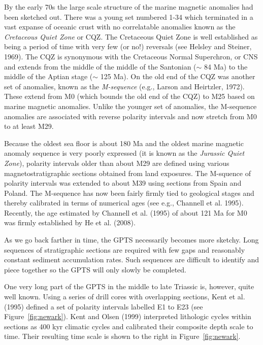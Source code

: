 By the early 70s  the large scale structure of the marine magnetic anomalies had been sketched out.  There was a young set numbered 1-34 which terminated in a vast expanse of oceanic crust with no correlatable anomalies known as the 
{\it Cretaceous Quiet Zone} or CQZ.   The Cretaceous Quiet Zone is well established as being a period of time with very few (or no!) reversals (see 
Helsley and Steiner, 1969). \nocite{helsley69}  The CQZ is synonymous with the Cretaceous Normal Superchron, or CNS and extends from the middle of the middle of the Santonian ($\sim$ 84 Ma) to the middle of the Aptian stage ($\sim$ 125 Ma).  
On the old end of the CQZ was another set of anomalies,  known as the 
{\it M-sequence}   (e.g., 
Larson and Heirtzler, 1972).  \nocite{larson72}    These extend from M0 (which bounds the old end of the  CQZ)  to M25 based on marine magnetic anomalies.      Unlike the younger set of anomalies, the M-sequence anomalies are associated with reverse polarity intervals and now stretch from M0 to at least M29.  

Because the oldest sea floor is about 180 Ma and the oldest marine magnetic anomaly sequence is very poorly expressed (it is known as the  
{\it Jurassic Quiet Zone}), polarity intervals older than  about M29 are defined 
 using various magnetostratigraphic  sections obtained from land exposures.   
The M-squence of polarity intervals was extended to about M39 using sections from  Spain and Poland.  The M-sequence has now been fairly firmly tied to geological stages  and thereby calibrated in terms of numerical ages (see e.g., 
Channell et al. 1995).  \nocite{channell95}   Recently, the age estimated by Channell et al. (1995) of about 121 Ma for M0 was firmly established by 
He et al. (2008).  \nocite{he08}    

As we go back farther in time, the GPTS  necessarily becomes  more sketchy.  Long sequences of stratigraphic sections are required with few gaps and reasonably constant sediment accumulation rates.   Such sequences are difficult to identify and piece together so the GPTS will only slowly be completed.   

 One very long part of the GPTS in the middle to late Triassic is, however, quite well known.     Using a series of drill cores with overlapping sections, 
 Kent et al. (1995) defined a set of polarity intervals labelled E1 to E23 (see Figure~\ref{fig:newark}).  Kent and 
 Olsen (1999) \nocite{kent95} \nocite{kent99b} interpreted  lithologic cycles within sections as 400 kyr climatic cycles and calibrated their composite depth scale to time.    Their resulting time scale is shown to the right in Figure~\ref{fig:newark}.    
 
